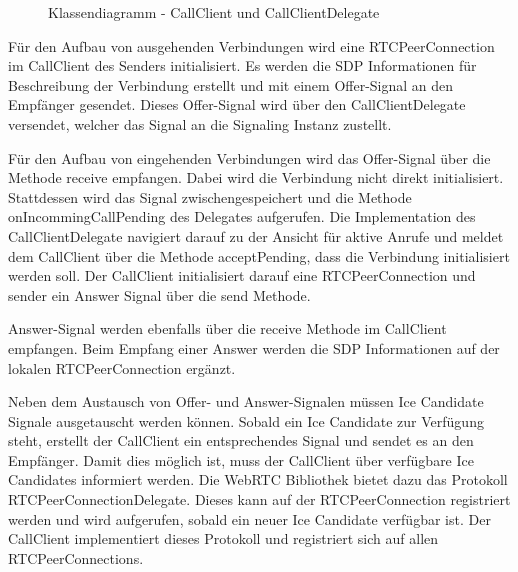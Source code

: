 \begin{figure}[h]
    \centering
    \begin{minipage}[b]{0.6\textwidth}
        \caption{Klassendiagramm - CallClient und CallClientDelegate}
    \end{minipage}
\end{figure}

Für den Aufbau von ausgehenden Verbindungen wird eine RTCPeerConnection im CallClient des Senders initialisiert.
Es werden die SDP Informationen für Beschreibung der Verbindung erstellt und mit einem Offer-Signal an den Empfänger gesendet.
Dieses Offer-Signal wird über den CallClientDelegate versendet, welcher das Signal an die Signaling Instanz zustellt.

Für den Aufbau von eingehenden Verbindungen wird das Offer-Signal über die Methode receive empfangen.
Dabei wird die Verbindung nicht direkt initialisiert.
Stattdessen wird das Signal zwischengespeichert und die Methode onIncommingCallPending des Delegates aufgerufen.
Die Implementation des CallClientDelegate navigiert darauf zu der Ansicht für aktive Anrufe und meldet dem CallClient über die Methode acceptPending, dass die Verbindung initialisiert werden soll.
Der CallClient initialisiert darauf eine RTCPeerConnection und sender ein Answer Signal über die send Methode.

Answer-Signal werden ebenfalls über die receive Methode im CallClient empfangen.
Beim Empfang einer Answer werden die SDP Informationen auf der lokalen RTCPeerConnection ergänzt.

Neben dem Austausch von Offer- und Answer-Signalen müssen Ice Candidate Signale ausgetauscht werden können.
Sobald ein Ice Candidate zur Verfügung steht, erstellt der CallClient ein entsprechendes Signal und sendet es an den Empfänger.
Damit dies möglich ist, muss der CallClient über verfügbare Ice Candidates informiert werden.
Die WebRTC Bibliothek bietet dazu das Protokoll RTCPeerConnectionDelegate.
Dieses kann auf der RTCPeerConnection registriert werden und wird aufgerufen, sobald ein neuer Ice Candidate verfügbar ist.
Der CallClient implementiert dieses Protokoll und registriert sich auf allen RTCPeerConnections.


